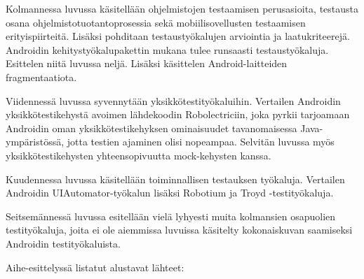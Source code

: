 Kolmannessa luvussa käsitellään ohjelmistojen testaamisen perusasioita, testausta osana ohjelmistotuotantoprosessia sekä mobiilisovellusten testaamisen erityispiirteitä. Lisäksi pohditaan testaustyökalujen arviointia ja laatukriteerejä. Androidin kehitystyökalupakettin mukana tulee runsaasti testaustyökaluja. Esittelen niitä luvussa neljä. Lisäksi käsittelen Android-laitteiden fragmentaatiota.

Viidennessä luvussa syvennytään yksikkötestityökaluihin. Vertailen Androidin yksikkötestikehystä avoimen lähdekoodin Robolectriciin, joka pyrkii tarjoamaan Androidin oman yksikkötestikehyksen ominaisuudet tavanomaisessa Java-ympäristössä, jotta testien ajaminen olisi nopeampaa. Selvitän luvussa myös yksikkötestikehysten yhteensopivuutta mock-kehysten kanssa.

Kuudennessa luvussa käsitellään toiminnallisen testauksen työkaluja. Vertailen Androidin UIAutomator-työkalun lisäksi Robotium ja Troyd -testityökaluja.

Seitsemännessä luvussa esitellään vielä lyhyesti muita kolmansien osapuolien testityökaluja, joita ei ole aiemmissa luvuissa käsitelty kokonaiskuvan saamiseksi Androidin testityökaluista.


Aihe-esittelyssä listatut alustavat lähteet: 
\cite{hyungkeunetal11}
\cite{kropp10}
\cite{mirzaeietal12}
\cite{wasserman10}
\cite{hampark11}
